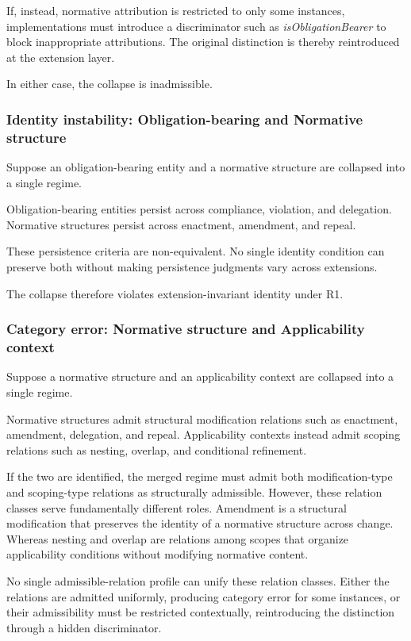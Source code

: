 If, instead, normative attribution is restricted to only some instances,
implementations must introduce a discriminator
such as \emph{isObligationBearer} to block inappropriate attributions.
The original distinction is thereby reintroduced at the extension layer.

In either case, the collapse is inadmissible.

\subsubsection{Identity instability: Obligation-bearing and Normative structure}

Suppose an obligation-bearing entity and a normative structure
are collapsed into a single regime.

Obligation-bearing entities persist across compliance,
violation, and delegation.
Normative structures persist across enactment,
amendment, and repeal.

These persistence criteria are non-equivalent.
No single identity condition can preserve both
without making persistence judgments vary across extensions.

The collapse therefore violates extension-invariant identity under R1.

\subsubsection{Category error: Normative structure and Applicability context}

Suppose a normative structure and an applicability context
are collapsed into a single regime.

Normative structures admit structural modification relations
such as enactment, amendment, delegation, and repeal.
Applicability contexts instead admit scoping relations
such as nesting, overlap, and conditional refinement.

If the two are identified, the merged regime must admit
both modification-type and scoping-type relations
as structurally admissible.
However, these relation classes serve fundamentally different roles.
Amendment is a structural modification
that preserves the identity of a normative structure across change.
Whereas nesting and overlap are relations
among scopes that organize applicability conditions without modifying
normative content.

No single admissible-relation profile can unify
these relation classes.
Either the relations are admitted uniformly,
producing category error for some instances,
or their admissibility must be restricted contextually,
reintroducing the distinction through a hidden discriminator.

